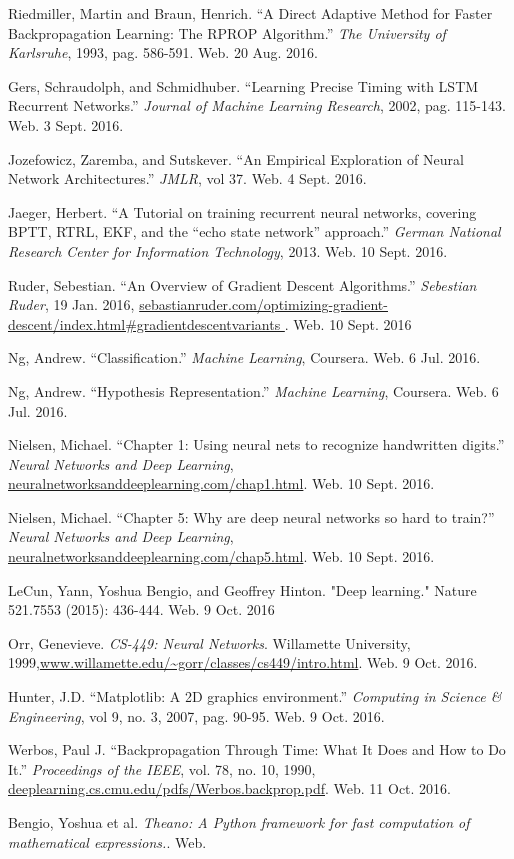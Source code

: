 \documentclass[12pt]{article}
\begin{document}
\begin{thebibliography}{9}
		Riedmiller, Martin and Braun, Henrich. ``A Direct Adaptive Method for
		Faster Backpropagation Learning: The RPROP Algorithm.'' \textit{The
		University of Karlsruhe}, 1993, pag. 586-591. Web. 20 Aug. 2016.

		Gers, Schraudolph, and Schmidhuber. ``Learning Precise Timing with LSTM
		Recurrent Networks.'' \textit{Journal of Machine Learning Research},
		2002, pag. 115-143. Web. 3 Sept. 2016.

		Jozefowicz, Zaremba, and Sutskever. ``An Empirical Exploration of Neural
		Network Architectures.'' \textit{JMLR}, vol 37. Web. 4 Sept. 2016.

		Jaeger, Herbert. ``A Tutorial on training recurrent neural networks,
		covering BPTT, RTRL, EKF, and the ``echo state network''
		approach.'' \textit{German National Research Center for Information
		Technology}, 2013. Web. 10 Sept. 2016.

		Ruder, Sebestian. ``An Overview of Gradient Descent Algorithms.''
		\textit{Sebestian Ruder}, 19 Jan. 2016,
		\url{sebastianruder.com/optimizing-gradient-descent/index.html#gradientdescentvariants
		}. Web. 10 Sept. 2016

		Ng, Andrew. ``Classification.'' \textit{Machine Learning}, Coursera.
		Web. 6 Jul. 2016.

		Ng, Andrew. ``Hypothesis Representation.'' \textit{Machine Learning}, Coursera.
		Web. 6 Jul. 2016.

		Nielsen, Michael. ``Chapter 1: Using neural nets to recognize
		handwritten digits.'' \textit{Neural Networks and Deep Learning},
		\url{neuralnetworksanddeeplearning.com/chap1.html}. Web. 10 Sept. 2016.

		Nielsen, Michael. ``Chapter 5: Why are deep neural networks so hard to
		train?'' \textit{Neural Networks and Deep Learning},
		\url{neuralnetworksanddeeplearning.com/chap5.html}. Web. 10 Sept. 2016.

		LeCun, Yann, Yoshua Bengio, and Geoffrey Hinton. "Deep learning." Nature
		521.7553 (2015): 436-444. Web. 9 Oct. 2016

		Orr, Genevieve. \textit{CS-449: Neural Networks}. Willamette University,
		1999,\url{www.willamette.edu/~gorr/classes/cs449/intro.html}. Web. 9
		Oct. 2016.

		Hunter, J.D. ``Matplotlib: A 2D graphics environment.''
		\textit{Computing in Science \& Engineering}, vol 9, no. 3, 2007, pag.
		90-95. Web. 9 Oct.  2016.

		Werbos, Paul J. ``Backpropagation Through Time: What It Does and How to
		Do It.'' \textit{Proceedings of the IEEE}, vol. 78, no. 10, 1990,
		\url{deeplearning.cs.cmu.edu/pdfs/Werbos.backprop.pdf}. Web. 11 Oct.
		2016.

		Bengio, Yoshua et al. \textit{Theano: A Python framework for fast
		computation of mathematical expressions.}. Web.
\end{thebibliography}
\end{document}
